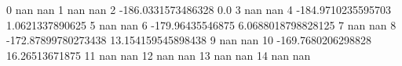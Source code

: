 0 nan nan
1 nan nan
2 -186.0331573486328 0.0
3 nan nan
4 -184.9710235595703 1.0621337890625
5 nan nan
6 -179.96435546875 6.0688018798828125
7 nan nan
8 -172.87899780273438 13.154159545898438
9 nan nan
10 -169.7680206298828 16.26513671875
11 nan nan
12 nan nan
13 nan nan
14 nan nan

